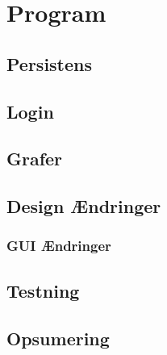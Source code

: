 \chapter{Program}

\section{Persistens}

\section{Login}

\section{Grafer}

\section{Design Ændringer}

\subsection{GUI Ændringer}

\section{Testning}

\section{Opsumering}
